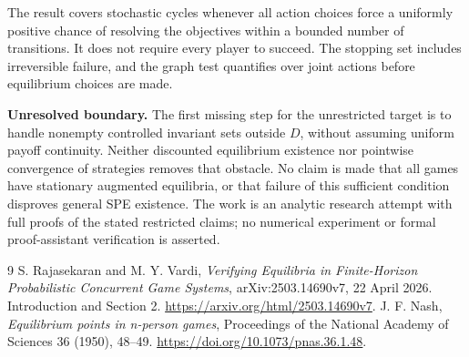 \documentclass[11pt]{article}
\theoremstyle{remark}\newtheorem{remark}[theorem]{Remark}
\begin{document}
The result covers stochastic cycles whenever all action choices force a uniformly positive chance of resolving the objectives within a bounded number of transitions. It does not require every player to succeed. The stopping set includes irreversible failure, and the graph test quantifies over joint actions before equilibrium choices are made.

\textbf{Unresolved boundary.} The first missing step for the unrestricted target is to handle nonempty controlled invariant sets outside $D$, without assuming uniform payoff continuity. Neither discounted equilibrium existence nor pointwise convergence of strategies removes that obstacle. No claim is made that all games have stationary augmented equilibria, or that failure of this sufficient condition disproves general SPE existence. The work is an analytic research attempt with full proofs of the stated restricted claims; no numerical experiment or formal proof-assistant verification is asserted.

\begin{thebibliography}{9}
 S. Rajasekaran and M. Y. Vardi, \emph{Verifying Equilibria in Finite-Horizon Probabilistic Concurrent Game Systems}, arXiv:2503.14690v7, 22 April 2026. Introduction and Section 2. \url{https://arxiv.org/html/2503.14690v7}.
 J. F. Nash, \emph{Equilibrium points in n-person games}, Proceedings of the National Academy of Sciences 36 (1950), 48--49. \url{https://doi.org/10.1073/pnas.36.1.48}.
\end{thebibliography}
\end{document}
